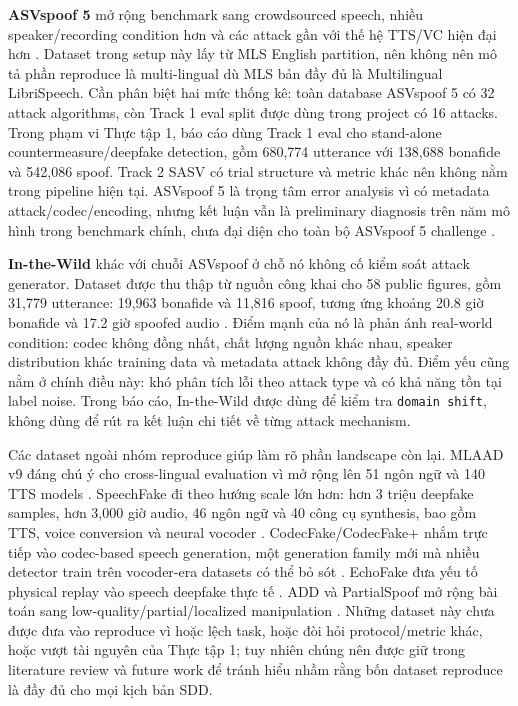 \textbf{ASVspoof 5} mở rộng benchmark sang crowdsourced speech, nhiều speaker/recording condition hơn và các attack gần với thế hệ TTS/VC hiện đại hơn \cite{asvspoof5_arxiv2024,asvspoof5_design}. Dataset trong setup này lấy từ MLS English partition, nên không nên mô tả phần reproduce là multi-lingual dù MLS bản đầy đủ là Multilingual LibriSpeech. Cần phân biệt hai mức thống kê: toàn database ASVspoof 5 có 32 attack algorithms, còn Track 1 eval split được dùng trong project có 16 attacks. Trong phạm vi Thực tập 1, báo cáo dùng Track 1 eval cho stand-alone countermeasure/deepfake detection, gồm 680,774 utterance với 138,688 bonafide và 542,086 spoof. Track 2 SASV có trial structure và metric khác nên không nằm trong pipeline hiện tại. ASVspoof 5 là trọng tâm error analysis vì có metadata attack/codec/encoding, nhưng kết luận vẫn là preliminary diagnosis trên năm mô hình trong benchmark chính, chưa đại diện cho toàn bộ ASVspoof 5 challenge \cite{asvspoof5_eval}.

\textbf{In-the-Wild} khác với chuỗi ASVspoof ở chỗ nó không cố kiểm soát attack generator. Dataset được thu thập từ nguồn công khai cho 58 public figures, gồm 31,779 utterance: 19,963 bonafide và 11,816 spoof, tương ứng khoảng 20.8 giờ bonafide và 17.2 giờ spoofed audio \cite{in_the_wild}. Điểm mạnh của nó là phản ánh real-world condition: codec không đồng nhất, chất lượng nguồn khác nhau, speaker distribution khác training data và metadata attack không đầy đủ. Điểm yếu cũng nằm ở chính điều này: khó phân tích lỗi theo attack type và có khả năng tồn tại label noise. Trong báo cáo, In-the-Wild được dùng để kiểm tra \texttt{domain shift}, không dùng để rút ra kết luận chi tiết về từng attack mechanism.

Các dataset ngoài nhóm reproduce giúp làm rõ phần landscape còn lại. MLAAD v9 đáng chú ý cho cross-lingual evaluation vì mở rộng lên 51 ngôn ngữ và 140 TTS models \cite{mlaad}. SpeechFake đi theo hướng scale lớn hơn: hơn 3 triệu deepfake samples, hơn 3,000 giờ audio, 46 ngôn ngữ và 40 công cụ synthesis, bao gồm TTS, voice conversion và neural vocoder \cite{speechfake}. CodecFake/CodecFake+ nhắm trực tiếp vào codec-based speech generation, một generation family mới mà nhiều detector train trên vocoder-era datasets có thể bỏ sót \cite{codecfake,codecfakeplus}. EchoFake đưa yếu tố physical replay vào speech deepfake thực tế \cite{echofake}. ADD và PartialSpoof mở rộng bài toán sang low-quality/partial/localized manipulation \cite{add2022,add2023,partialspoof}. Những dataset này chưa được đưa vào reproduce vì hoặc lệch task, hoặc đòi hỏi protocol/metric khác, hoặc vượt tài nguyên của Thực tập 1; tuy nhiên chúng nên được giữ trong literature review và future work để tránh hiểu nhầm rằng bốn dataset reproduce là đầy đủ cho mọi kịch bản SDD.


